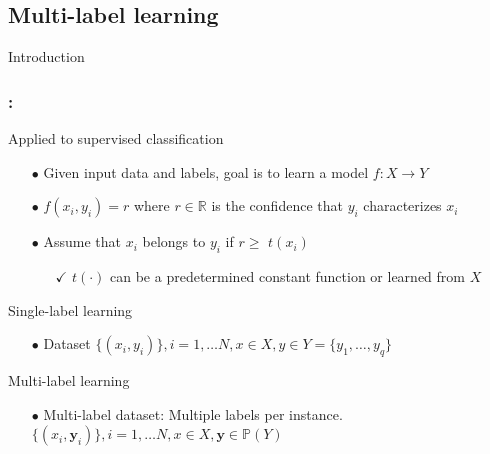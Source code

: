 \documentclass{beamer}
\begin{document}
\subsection{Multi-label learning}
\begin{frame}
\Huge{\centerline{Introduction}}
\end{frame}
\begin{frame}
\frametitle{\insertsection : \insertsubsection}
Applied to supervised classification
\begin{itemize}
\item[$\bullet$] Given input data and labels, goal is to learn a model $f: X \rightarrow Y$ 
\item[$\bullet$] $f(x_i, y_i) = r$ where $r\in \mathbb{R}$ is the confidence that $y_i$ characterizes $x_i$
\item[$\bullet$] Assume that $x_i$ belongs to $y_i$ if $r \ge $ $t(x_i)$
\begin{itemize}%
\item[$\checkmark$] $t(\cdot)$ can be a predetermined constant function or learned from $X$
\end{itemize}
\end{itemize}

Single-label learning
\begin{itemize}
\item[$\bullet$] Dataset $\{ (x_i, y_i)\}, i = 1, \dots N, x \in X, y \in Y=\{y_1,\dots,y_q\}$
\end{itemize}

Multi-label learning
\begin{itemize}
\item[$\bullet$] Multi-label dataset: Multiple labels per instance. $\{ (x_i, \bm{y}_i)\}, i = 1, \dots N, x \in X, \bm{y} \in \mathbb{P}(Y)$

\end{itemize}
\end{frame}
\end{document}
